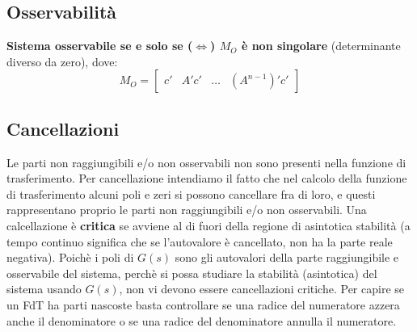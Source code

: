 \begin{landscape}
\begin{multicols*}{3}
    \subsection{Osservabilità}
    \textbf{Sistema osservabile se e solo se ($\Leftrightarrow$) $M_O$ è non singolare} (determinante diverso da zero), dove:
    \[
        M_O = \left[\begin{matrix}
            c' & A'c' & \dots & (A^{n-1})' c'
        \end{matrix}\right]
    \]
    \subsection{Cancellazioni}
    Le parti non raggiungibili e/o non osservabili non sono presenti nella funzione di trasferimento.\newline
    Per cancellazione intendiamo il fatto che nel calcolo della funzione di trasferimento alcuni poli
    e zeri si possono cancellare fra di loro, e questi rappresentano proprio le parti non raggiungibili
    e/o non osservabili.\newline
    \newline
    Una calcellazione è \textbf{critica} se avviene al di fuori della regione di asintotica stabilità (a tempo continuo significa che se l'autovalore è cancellato, non ha la parte reale negativa).\newline
    Poichè i poli di $G(s)$ sono gli autovalori della parte raggiungibile e osservabile del sistema, perchè si possa studiare la stabilità (asintotica) del sistema usando $G(s)$, non vi devono essere cancellazioni critiche.
    \newline
    \newline
    Per capire se un FdT ha parti nascoste basta controllare se una radice del numeratore azzera anche il denominatore o se una radice del denominatore annulla il numeratore. 

\end{multicols*}
\end{landscape}
